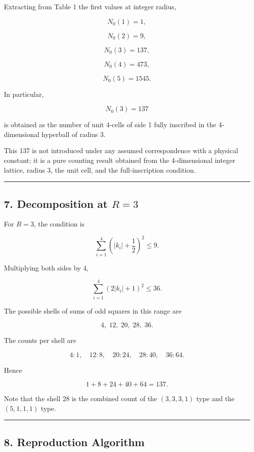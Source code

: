 \documentclass[
]{article}
\begin{document}
Extracting from Table 1 the first values at integer radius,

\[
N_0(1)=1,
\]

\[
N_0(2)=9,
\]

\[
N_0(3)=137,
\]

\[
N_0(4)=473,
\]

\[
N_0(5)=1545 .
\]

In particular,

\[
N_0(3)=137
\]

is obtained as the number of unit 4-cells of side 1 fully inscribed in
the 4-dimensional hyperball of radius 3.

This 137 is not introduced under any assumed correspondence with a
physical constant; it is a pure counting result obtained from the
4-dimensional integer lattice, radius 3, the unit cell, and the
full-inscription condition.

\begin{center}\rule{0.5\linewidth}{0.5pt}\end{center}

\subsection{\texorpdfstring{7. Decomposition at
\(R=3\)}{7. Decomposition at R=3}}\label{decomposition-at-r3}

For \(R=3\), the condition is

\[
\sum_{i=1}^{4}
\left(|k_i|+\frac12\right)^2
\le 9 .
\]

Multiplying both sides by 4,

\[
\sum_{i=1}^{4}
(2|k_i|+1)^2
\le 36 .
\]

The possible shells of sums of odd squares in this range are

\[
4,\;12,\;20,\;28,\;36 .
\]

The counts per shell are

\[
4:1,\quad
12:8,\quad
20:24,\quad
28:40,\quad
36:64 .
\]

Hence

\[
1+8+24+40+64=137 .
\]

Note that the shell \(28\) is the combined count of the \((3,3,3,1)\)
type and the \((5,1,1,1)\) type.

\begin{center}\rule{0.5\linewidth}{0.5pt}\end{center}

\subsection{8. Reproduction Algorithm}\label{reproduction-algorithm}
\end{document}
